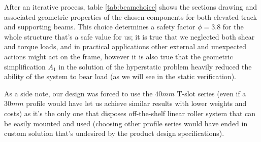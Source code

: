 	
	
	After an iterative process, table \ref{tab:beamchoice} shows the sections drawing and associated geometric properties of the chosen components for both elevated track and supporting beams. This choice determines a safety factor $\phi = 3.8$ for the whole structure that's a safe value for us; it is true that we neglected both shear and torque loads, and in practical applications other external and unexpected actions might act on the frame, however it is also true that the geometric simplification $A_1$ in the solution of the hyperstatic problem heavily reduced the ability of the system to bear load (as we will see in the static verification).
	
	As a side note, our design was forced to use the $40mm$ T-slot series (even if a $30mm$ profile would have let us achieve similar results with lower weights and costs) as it's the only one that disposes off-the-shelf linear roller system that can be easily mounted and used (choosing other profile series would have ended in custom solution that's undesired by the product design specifications).
	
	
	

	
	
	
	
	
	
	
	
	
	
	
	
	
	
	
	
	
	
	
	
	
	
	
	
	
	
	
	
	
	
	
	